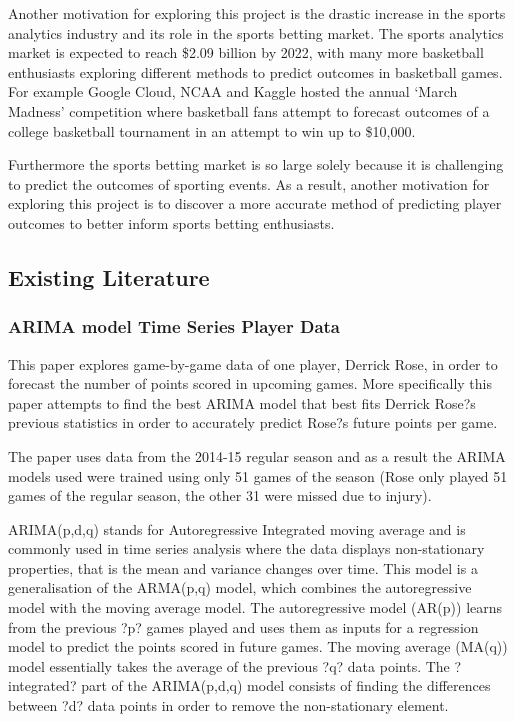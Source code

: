 \documentclass[a4paper,11pt,twoside]{article}
\begin{document}
Another motivation for exploring this project is the drastic increase in the sports analytics industry and its role in the sports betting market. The sports analytics market is expected to reach \$2.09 billion by 2022, with many more basketball enthusiasts exploring different methods to predict outcomes in basketball games. For example Google Cloud, NCAA and Kaggle hosted the annual `March Madness' competition where basketball fans attempt to forecast outcomes of a college basketball tournament in an attempt to win up to \$10,000.

 Furthermore the sports betting market is so large solely because it is challenging to predict the outcomes of sporting events. As a result, another motivation for exploring this project is to discover a more accurate method of predicting player outcomes to better inform sports betting enthusiasts. 



\subsection{Existing Literature}
 
\subsubsection{ARIMA model Time Series Player Data}

This paper explores game-by-game data of one player, Derrick Rose, in order to forecast the number of points scored in upcoming games. More specifically this paper attempts to find the best ARIMA model that best fits Derrick Rose?s previous statistics in order to accurately predict Rose?s future points per game. 

The paper uses data from the 2014-15 regular season and as a result the ARIMA models used  were trained using only 51 games of the season (Rose only played 51 games of the regular season, the other 31 were missed due to injury).

ARIMA(p,d,q) stands for Autoregressive Integrated moving average and is commonly used in time series analysis where the data displays non-stationary properties, that is the mean and variance changes over time. This model is a generalisation of the ARMA(p,q) model, which combines the autoregressive model with the moving average model. The autoregressive model (AR(p)) learns from the previous ?p? games played and uses them as inputs for a regression model to predict the points scored in future games. The moving average (MA(q)) model essentially takes the average of the previous ?q? data points. The ?integrated? part of the ARIMA(p,d,q) model consists of finding the differences between ?d? data points in order to remove the non-stationary element.
\end{document}
